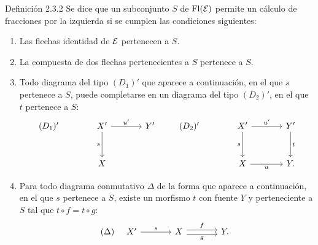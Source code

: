 \begin{statement}{Definición 2.3.2}
Se dice que un subconjunto $S$ de $\operatorname{Fl}(\mathcal E)$ permite un cálculo de fracciones por la izquierda si se cumplen las condiciones siguientes:
\begin{enumerate}[label=(\alph*)]
\item[(a')] Las flechas identidad de $\mathcal E$ pertenecen a $S$.
\item[(b')] La compuesta de dos flechas pertenecientes a $S$ pertenece a $S$.
\item[(c')] Todo diagrama del tipo $(D_1)'$ que aparece a continuación, en el que $s$ pertenece a $S$, puede completarse en un diagrama del tipo $(D_2)'$, en el que $t$ pertenece a $S$:
\[
\begin{tikzcd}[column sep=large,row sep=large]
(D_1)'& X' \arrow[r,"u'"] \arrow[d,"s"'] & Y'\\
& X
\end{tikzcd}
\qquad
\begin{tikzcd}[column sep=large,row sep=large]
(D_2)'& X' \arrow[r,"u'"] \arrow[d,"s"'] & Y' \arrow[d,"t"]\\
& X \arrow[r,"u"'] & Y .
\end{tikzcd}
\]
\item[(d')] Para todo diagrama conmutativo $\Delta$ de la forma que aparece a continuación, en el que $s$ pertenece a $S$, existe un morfismo $t$ con fuente $Y$ y perteneciente a $S$ tal que $t\circ f=t\circ g$:
\[
(\Delta)\quad
\begin{tikzcd}[column sep=large]
X' \arrow[r,"s"] & X \arrow[r,shift left,"f"] \arrow[r,shift right,"g"'] & Y .
\end{tikzcd}
\]
\end{enumerate}
\end{statement}
